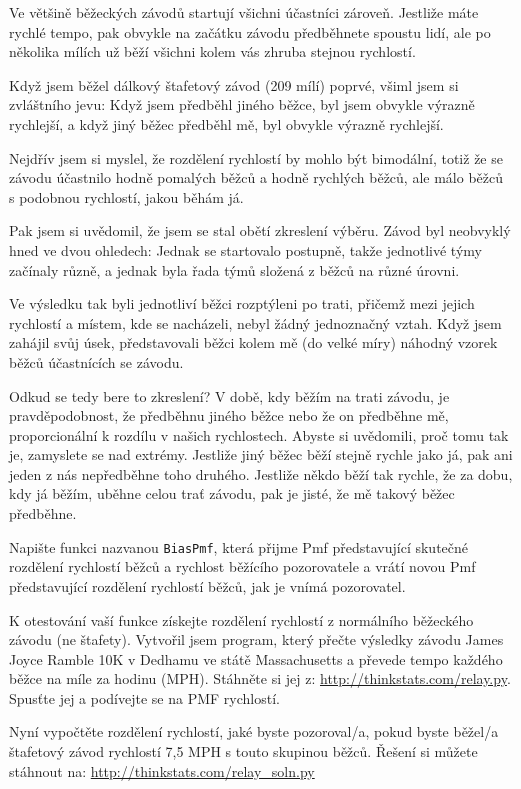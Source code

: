 \documentclass[12pt]{book}
\begin{document}
\begin{exercise}
\label{relay}

Ve většině běžeckých závodů startují všichni účastníci zároveň.  Jestliže máte rychlé tempo, pak obvykle na začátku závodu předběhnete spoustu lidí, ale po několika mílích už běží všichni kolem vás zhruba stejnou rychlostí.

Když jsem běžel dálkový štafetový závod (209 mílí) poprvé, všiml jsem si zvláštního jevu: Když jsem předběhl jiného běžce, byl jsem obvykle výrazně rychlejší, a když jiný běžec předběhl mě, byl obvykle výrazně rychlejší.

Nejdřív jsem si myslel, že rozdělení rychlostí by mohlo být bimodální, totiž že se závodu účastnilo hodně pomalých běžců a hodně rychlých běžců, ale málo běžců s podobnou rychlostí, jakou běhám já.

Pak jsem si uvědomil, že jsem se stal obětí zkreslení výběru. Závod byl neobvyklý hned ve dvou ohledech: Jednak se startovalo postupně, takže jednotlivé týmy začínaly různě, a jednak byla řada týmů složená z běžců na různé úrovni.

Ve výsledku tak byli jednotliví běžci rozptýleni po trati, přičemž mezi jejich rychlostí a místem, kde se nacházeli, nebyl žádný jednoznačný vztah. Když jsem zahájil svůj úsek, představovali běžci kolem mě (do velké míry) náhodný vzorek běžců účastnících se závodu.

Odkud se tedy bere to zkreslení?  V době, kdy běžím na trati závodu, je pravděpodobnost, že předběhnu jiného běžce nebo že on předběhne mě, proporcionální k rozdílu v našich rychlostech. Abyste si uvědomili, proč tomu tak je, zamyslete se nad extrémy. Jestliže jiný běžec běží stejně rychle jako já, pak ani jeden z nás nepředběhne toho druhého. Jestliže někdo běží tak rychle, že za dobu, kdy já běžím, uběhne celou trať závodu, pak je jisté, že mě takový běžec předběhne.

Napište funkci nazvanou {\tt BiasPmf}, která přijme Pmf představující skutečné rozdělení rychlostí běžců a rychlost běžícího pozorovatele a vrátí novou Pmf představující rozdělení rychlostí běžců, jak je vnímá pozorovatel.

K otestování vaší funkce získejte rozdělení rychlostí z normálního běžeckého závodu (ne štafety).
Vytvořil jsem program, který přečte výsledky závodu James Joyce Ramble 10K v Dedhamu ve státě Massachusetts a převede tempo každého běžce na míle za hodinu (MPH). Stáhněte si jej z:
\url{http://thinkstats.com/relay.py}.  Spusťte jej a podívejte se na PMF rychlostí.

Nyní vypočtěte rozdělení rychlostí, jaké byste pozoroval/a, pokud byste běžel/a štafetový závod rychlostí
7,5 MPH s touto skupinou běžců.  Řešení si můžete stáhnout na: \url{http://thinkstats.com/relay_soln.py}

\end{exercise}
\end{document}
